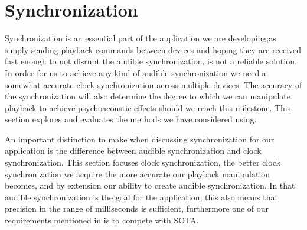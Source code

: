 \section{Synchronization}
Synchronization is an essential part of the application we are developing;as simply sending playback commands between devices and hoping they are received fast enough to not disrupt the audible synchronization, is not a reliable solution.
In order for us to achieve any kind of audible synchronization we need a somewhat accurate clock synchronization across multiple devices.
The accuracy of the synchronization will also determine the degree to which we can manipulate playback to achieve psychoacoustic effects should we reach this milestone.
This section explores and evaluates the methods we have considered using.

An important distinction to make when discussing synchronization for our application is the difference between audible synchronization and clock synchronization.
This section focuses clock synchronization, the better clock synchronization we acquire the more accurate our playback manipulation becomes, and by extension our ability to create audible synchronization.
In that audible synchronization is the goal for the application, this also means that precision in the range of milliseconds is sufficient, furthermore one of our requirements mentioned in  is to compete with \ac{SOTA}.

